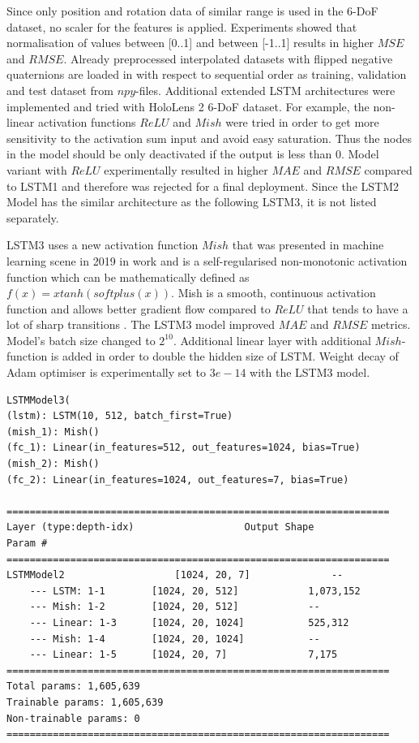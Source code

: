 Since only position and rotation data of similar range is used in the 6-DoF dataset, no scaler for the features is applied.  Experiments showed that normalisation of values between [0..1] and between [-1..1] results in higher $MSE$ and $RMSE$. Already preprocessed interpolated datasets with flipped negative quaternions are loaded in with respect to sequential order as training, validation and test dataset from $npy$-files. Additional extended LSTM architectures were implemented and tried with HoloLens 2 6-DoF dataset. For example, the non-linear activation functions $ReLU$ and $Mish$ were tried in order to get more sensitivity to the activation sum input and avoid easy saturation. Thus the nodes in the model should be only deactivated if the output is less than 0. Model variant with $ReLU$ experimentally resulted in higher $MAE$ and $RMSE$ compared to LSTM1 and therefore was rejected for a final deployment. Since the LSTM2 Model has the similar architecture as the following LSTM3, it is not listed separately.

LSTM3 uses a new activation function $Mish$ that was presented in machine learning scene in 2019 in work \cite{mish} and is a self-regularised non-monotonic activation function which can be mathematically defined as $f(x)=xtanh(softplus(x))$. Mish is a smooth, continuous activation function and allows better gradient flow compared to $ReLU$ that tends to have a lot of sharp transitions \cite{mish}. The LSTM3 model improved $MAE$ and $RMSE$ metrics. Model's batch size changed to $2^{10}$. Additional linear layer with additional $Mish$-function is added in order to double the hidden size of LSTM. Weight decay of Adam optimiser is experimentally set to $3e-14$ with the LSTM3 model.
 
\begin{lstlisting}[caption={LSTM3 with Mish activation function},captionpos=b]
LSTMModel3(
(lstm): LSTM(10, 512, batch_first=True)
(mish_1): Mish()
(fc_1): Linear(in_features=512, out_features=1024, bias=True)
(mish_2): Mish()
(fc_2): Linear(in_features=1024, out_features=7, bias=True)

==================================================================
Layer (type:depth-idx)                   Output Shape              Param #
==================================================================
LSTMModel2                   [1024, 20, 7]              --
	--- LSTM: 1-1        [1024, 20, 512]            1,073,152
	--- Mish: 1-2        [1024, 20, 512]            --
	--- Linear: 1-3      [1024, 20, 1024]           525,312
	--- Mish: 1-4        [1024, 20, 1024]           --
	--- Linear: 1-5      [1024, 20, 7]              7,175
==================================================================
Total params: 1,605,639
Trainable params: 1,605,639
Non-trainable params: 0
==================================================================
\end{lstlisting}

